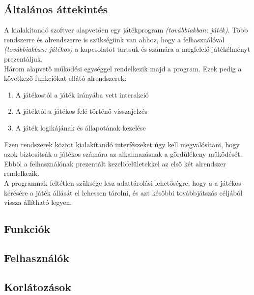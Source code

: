 \subsection{Általános áttekintés}

\indent A kialakítandó szoftver alapvetően egy játékprogram \emph{(továbbiakban: játék)}. Több rendszerre és alrendszerre is szükségünk van ahhoz, hogy a felhasználóval \emph{(továbbiakban: játékos)} a kapcsolatot tartsuk és számára a megfelelő játékélményt prezentáljuk.\\
\indent Három alapvető működési egységgel rendelkezik majd a program. Ezek pedig a következő funkciókat ellátó alrendszerek:
\begin{enumerate}
	\setlength\itemsep{0pt}
	\item A játékostól a játék irányába vett interakció
	\item A játéktól a játékos felé történő visszajelzés 
	\item A játék logikájának és állapotának kezelése
\end{enumerate}
Ezen rendszerek között kialakítandó interfészeket úgy kell megvalósítani, hogy azok biztosítsák a játékos számára az alkalmazásnak a gördülékeny működését. Ebből a felhasználónak prezentált kezelőfelületekkel az első két alrendszer rendelkezik.\\
\indent A programnak feltétlen szüksége lesz adattárolási lehetőségre, hogy a a játékos kérésére a játék állását el lehessen tárolni, és azt későbbi továbbjátszás céljából vissza állítható legyen.

\subsection{Funkciók}

\subsection{Felhasználók}

\subsection{Korlátozások}

